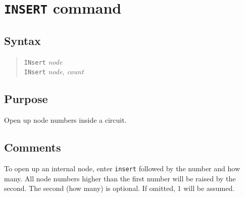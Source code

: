 %
%
%
%
\section{{\tt INSERT} command}
\subsection{Syntax}
\begin{verse}
{\tt INsert} {\it node}\\
{\tt INsert} {\it node, count}
\end{verse}
\subsection{Purpose}

Open up node numbers inside a circuit.
\subsection{Comments}

To open up an internal node, enter {\tt insert} followed by the number and
how many.  All node numbers higher than the first number will be raised by
the second.  The second (how many) is optional.  If omitted, 1 will be
assumed.
